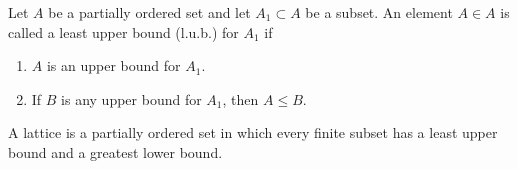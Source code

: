 Let $A$ be a partially ordered set and let $A_1 \subset A$ be a subset. An element $A \in A$ is called a least upper bound (l.u.b.) for $A_1$ if

\begin{enumerate}
\item $A$ is an upper bound for $A_1$.
\item If $B$ is any upper bound for $A_1$, then $A \leq B$.
\end{enumerate}

A lattice is a partially ordered set in which every finite subset has a least upper bound and a greatest lower bound.
